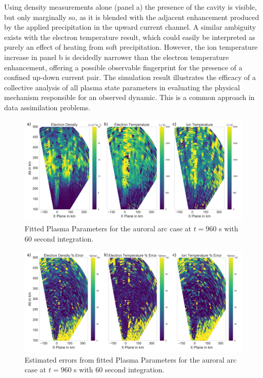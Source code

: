 Using density measurements alone (panel a) the presence of the cavity is visible, but only marginally so, as it is blended with the adjacent  enhancement produced by the applied precipitation in the upward current channel.  A similar ambiguity exists with the electron temperature result, which could easily be interpreted as purely an effect of heating from soft precipitation.   However, the ion temperature increase in panel b is decidedly narrower than the electron temperature enhancement, offering a possible observable fingerprint for the presence of a confined up-down current pair.  The simulation result illustrates the efficacy of a collective analysis of all plasma state parameters in evaluating the physical mechanism responsible for an observed dynamic.  This is a common approach in data assimilation problems.


\begin{figure}[!t]
\centering
\includegraphics[width=6in]{0960_60_int}
\caption{Fitted Plasma Parameters for the auroral arc case at $t=960$ s with 60 second integration.}
\label{fig:fplparamst60}
\end{figure}

\begin{figure}[!t]
\centering
\includegraphics[width=6in]{0960_60_int_err}
\caption{Estimated errors from fitted Plasma Parameters for the auroral arc case at $t=960$ s with 60 second integration.}
\label{fig:fplparamst60err}
\end{figure}

